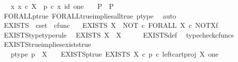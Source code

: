 \begin{isabellebody}
\ \ \ {\isachardoublequoteopen}{\isacharparenleft}{\kern0pt}{\isacharparenleft}{\kern0pt}{\isasymAnd}x{\isachardot}{\kern0pt}\ x\ {\isasymin}\isactrlsub c\ X\ {\isasymLongrightarrow}\ p\ {\isasymcirc}\isactrlsub c\ {\isasymlangle}x{\isacharcomma}{\kern0pt}\ id\ one{\isasymrangle}\ {\isacharequal}{\kern0pt}\ {\isasymt}{\isacharparenright}{\kern0pt}\ {\isasymLongrightarrow}\ P{\isacharparenright}{\kern0pt}\ {\isasymLongrightarrow}\ P{\isachardoublequoteclose}\isanewline
%
\isadelimproof
\ \ %
\endisadelimproof
%
\isatagproof
{}\isamarkupfalse%
\ FORALL{\isacharunderscore}{\kern0pt}p{\isacharunderscore}{\kern0pt}true\ FORALL{\isacharunderscore}{\kern0pt}true{\isacharunderscore}{\kern0pt}implies{\isacharunderscore}{\kern0pt}all{\isacharunderscore}{\kern0pt}true{}\ p{\isacharunderscore}{\kern0pt}type\ \isamarkupfalse%
\ auto%
\endisatagproof
{\isafoldproof}%
%
\isadelimproof
%
\endisadelimproof
%
\isadelimdocument
%
\endisadelimdocument
%
\isatagdocument
%
\isamarkuptrue%
%
\endisatagdocument
{\isafolddocument}%
%
\isadelimdocument
%
\endisadelimdocument
{}\isamarkupfalse%
\ EXISTS\ {\isacharcolon}{\kern0pt}{\isacharcolon}{\kern0pt}\ {\isachardoublequoteopen}cset\ {\isasymRightarrow}\ cfunc{\isachardoublequoteclose}\ \isanewline
\ \ {\isachardoublequoteopen}EXISTS\ X\ {\isacharequal}{\kern0pt}\ NOT\ {\isasymcirc}\isactrlsub c\ FORALL\ X\ {\isasymcirc}\isactrlsub c\ NOT\isactrlbsup X\isactrlesup \isactrlsub f{\isachardoublequoteclose}\isanewline
\isanewline
{}\isamarkupfalse%
\ EXISTS{\isacharunderscore}{\kern0pt}type{\isacharbrackleft}{\kern0pt}type{\isacharunderscore}{\kern0pt}rule{\isacharbrackright}{\kern0pt}{\isacharcolon}{\kern0pt}\isanewline
\ \ {\isachardoublequoteopen}EXISTS\ X\ {\isacharcolon}{\kern0pt}\ {\isasymOmega}\isactrlbsup X\isactrlesup \ {\isasymrightarrow}\ {\isasymOmega}{\isachardoublequoteclose}\isanewline
%
\isadelimproof
\ \ %
\endisadelimproof
%
\isatagproof
{}\isamarkupfalse%
\ EXISTS{\isacharunderscore}{\kern0pt}def\ \isamarkupfalse%
\ typecheck{\isacharunderscore}{\kern0pt}cfuncs%
\endisatagproof
{\isafoldproof}%
%
\isadelimproof
\isanewline
%
\endisadelimproof
\isanewline
{}\isamarkupfalse%
\ EXISTS{\isacharunderscore}{\kern0pt}true{\isacharunderscore}{\kern0pt}implies{\isacharunderscore}{\kern0pt}exists{\isacharunderscore}{\kern0pt}true{\isacharcolon}{\kern0pt}\isanewline
\ \ \ p{\isacharunderscore}{\kern0pt}type{\isacharcolon}{\kern0pt}\ {\isachardoublequoteopen}p\ {\isacharcolon}{\kern0pt}\ X\ {\isasymrightarrow}\ {\isasymOmega}{\isachardoublequoteclose}\ \ EXISTS{\isacharunderscore}{\kern0pt}p{\isacharunderscore}{\kern0pt}true{\isacharcolon}{\kern0pt}\ {\isachardoublequoteopen}EXISTS\ X\ {\isasymcirc}\isactrlsub c\ {\isacharparenleft}{\kern0pt}p\ {\isasymcirc}\isactrlsub c\ left{\isacharunderscore}{\kern0pt}cart{\isacharunderscore}{\kern0pt}proj\ X\ one{\isacharparenright}{\kern0pt}\isactrlsup {\isasymsharp}\ {\isacharequal}{\kern0pt}\ {\isasymt}{\isachardoublequoteclose}\isanewline

\end{isabellebody}

